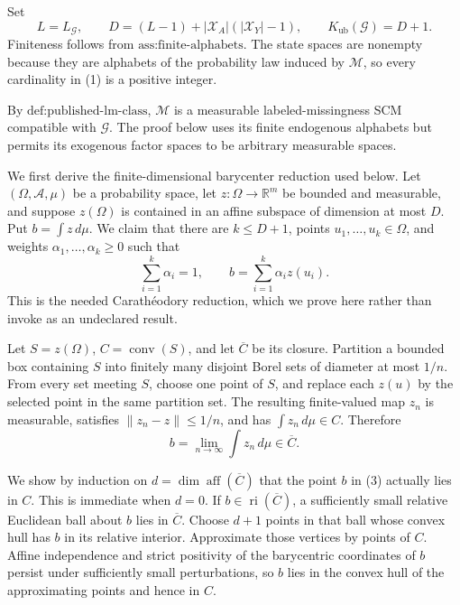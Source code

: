 Set
\[
L=L_{\mathcal G},
\qquad
D=(L-1)+|\mathcal X_A|(|\mathcal X_Y|-1),
\qquad
K_{\mathrm{ub}}(\mathcal G)=D+1.
\tag{1}
\]
Finiteness follows from \(\text{ass:finite-alphabets}\). The state spaces are nonempty because they are alphabets of the probability law induced by \(\mathcal M\), so every cardinality in (1) is a positive integer.

By \(\text{def:published-lm-class}\), \(\mathcal M\) is a measurable labeled-missingness SCM compatible with \(\mathcal G\). The proof below uses its finite endogenous alphabets but permits its exogenous factor spaces to be arbitrary measurable spaces.

We first derive the finite-dimensional barycenter reduction used below. Let \((\Omega,\mathcal A,\mu)\) be a probability space, let \(z:\Omega\to\mathbb R^m\) be bounded and measurable, and suppose \(z(\Omega)\) is contained in an affine subspace of dimension at most \(D\). Put \(b=\int z\,d\mu\). We claim that there are \(k\leq D+1\), points \(u_1,\ldots,u_k\in\Omega\), and weights \(\alpha_1,\ldots,\alpha_k\geq0\) such that
\[
\sum_{i=1}^k\alpha_i=1,
\qquad
b=\sum_{i=1}^k\alpha_i z(u_i).
\tag{2}
\]
This is the needed Carath\'{e}odory reduction, which we prove here rather than invoke as an undeclared result.

Let \(S=z(\Omega)\), \(C=\operatorname{conv}(S)\), and let \(\overline C\) be its closure. Partition a bounded box containing \(S\) into finitely many disjoint Borel sets of diameter at most \(1/n\). From every set meeting \(S\), choose one point of \(S\), and replace each \(z(u)\) by the selected point in the same partition set. The resulting finite-valued map \(z_n\) is measurable, satisfies \(\|z_n-z\|\leq1/n\), and has \(\int z_n\,d\mu\in C\). Therefore
\[
b=\lim_{n\to\infty}\int z_n\,d\mu\in\overline C.
\tag{3}
\]

We show by induction on \(d=\dim\operatorname{aff}(\overline C)\) that the point \(b\) in (3) actually lies in \(C\). This is immediate when \(d=0\). If \(b\in\operatorname{ri}(\overline C)\), a sufficiently small relative Euclidean ball about \(b\) lies in \(\overline C\). Choose \(d+1\) points in that ball whose convex hull has \(b\) in its relative interior. Approximate those vertices by points of \(C\). Affine independence and strict positivity of the barycentric coordinates of \(b\) persist under sufficiently small perturbations, so \(b\) lies in the convex hull of the approximating points and hence in \(C\).

